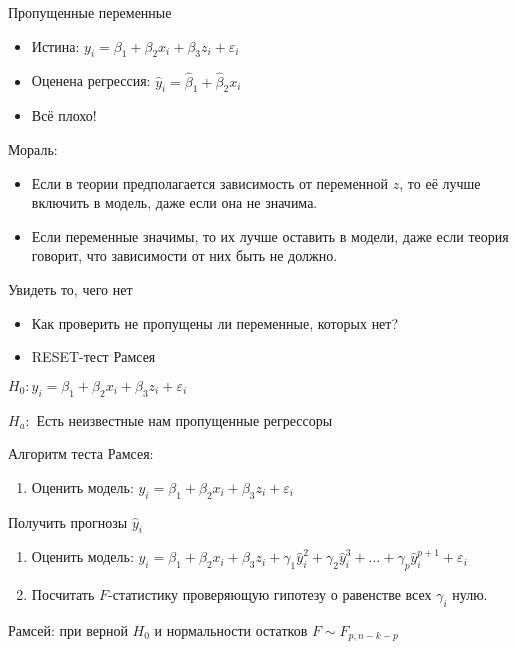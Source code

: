 \documentclass[russian,ignorenonframetext,]{beamer}
\providecommand{\tightlist}{%
  \setlength{\itemsep}{0pt}\setlength{\parskip}{0pt}}
\begin{document}
\begin{frame}{Пропущенные переменные}

\begin{itemize}
\item
  Истина: \(y_i = \beta_1 + \beta_2 x_i + \beta_3 z_i +\varepsilon_i\)
\item
  Оценена регрессия: \(\hat{y}_i=\hat{\beta}_1 + \hat{\beta}_2 x_i\)
\item
  Всё плохо!
\end{itemize}

\end{frame}

\begin{frame}{Мораль:}

\begin{itemize}
\item
  Если в теории предполагается зависимость от переменной \(z\), то её
  лучше включить в модель, даже если она не значима.
\item
  Если переменные значимы, то их лучше оставить в модели, даже если
  теория говорит, что зависимости от них быть не должно.
\end{itemize}

\end{frame}

\begin{frame}{Увидеть то, чего нет}

\begin{itemize}
\item
  Как проверить не пропущены ли переменные, которых нет?
\item
  RESET-тест Рамсея
\end{itemize}

\(H_0: y_i = \beta_1 + \beta_2 x_i + \beta_3 z_i + \varepsilon_i\)

\(H_a:\) Есть неизвестные нам пропущенные регрессоры

\end{frame}

\begin{frame}{Алгоритм теста Рамсея:}

\begin{enumerate}
\def\labelenumi{\arabic{enumi}.}
\tightlist
\item
  Оценить модель:
  \(y_i = \beta_1 + \beta_2 x_i + \beta_3 z_i + \varepsilon_i\)
\end{enumerate}

Получить прогнозы \(\hat{y}_i\)

\begin{enumerate}
\def\labelenumi{\arabic{enumi}.}
\setcounter{enumi}{1}
\item
  Оценить модель:
  \(y_i = \beta_1 + \beta_2 x_i + \beta_3 z_i + \gamma_1 \hat{y}^2_i + \gamma_2 \hat{y}^3_i + \ldots + \gamma_p \hat{y}_i^{p+1} + \varepsilon_i\)
\item
  Посчитать \(F\)-статистику проверяющую гипотезу о равенстве всех
  \(\gamma_i\) нулю.
\end{enumerate}

Рамсей: при верной \(H_0\) и нормальности остатков \(F\sim F_{p,n-k-p}\)

\end{frame}
\end{document}
